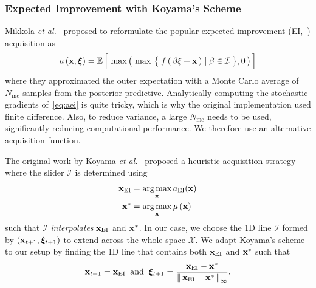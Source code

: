 \subsubsection{Expected Improvement with Koyama's Scheme}
Mikkola \textit{et al.}~\cite{10.1145/3072959.3073598} proposed to reformulate the popular expected improvement (EI,~\cite{jones_efficient_1998}) acquisition as
\begin{align}
  a\,(\mathbf{x}, \bm{\xi})
  = \mathbb{E}\,\Big[\, \max\big(\, \max\,\big\{\; f\,(\,\beta \xi + \mathbf{x}\,) \mid \beta \in \mathcal{I} \;\big\}, 0 \,\big)\,\Big]\label{eq:aei}
\end{align}
where they approximated the outer expectation with a Monte Carlo average of \(N_{\text{mc}}\) samples from the posterior predictive.
Analytically computing the stochastic gradients of~\cref{eq:aei} is quite tricky, which is why the original implementation used finite difference.
Also, to reduce variance, a large \(N_{\text{mc}}\) needs to be used, significantly reducing computational performance.
We therefore use an alternative acquisition function.

The original work by Koyama \textit{et al.}~\cite{koyama_sequential_2020} proposed a heuristic acquisition strategy where the slider \(\mathcal{I}\) is determined using
\begin{align}
  \mathbf{x}_{\mathrm{EI}}   &= \operatorname*{arg\,max}_{\mathbf{x}} a_{\mathrm{EI}}(\mathbf{x}) \label{eq:koyama_ei} \\
  \mathbf{x}^*   &= \operatorname*{arg\,max}_{\mathbf{x}} \mu\,(\mathbf{x}) \label{eq:koyama_opt}
\end{align}
such that \(\mathcal{I}\) \textit{interpolates} \(\mathbf{x}_{\mathrm{EI}}\) and \(\mathbf{x}^*\).
In our case, we choose the 1D line \(\mathcal{I}\) formed by \((\mathbf{x}_{t+1}, \bm{\xi}_{t+1})\) to extend across the whole space \(\mathcal{X}\).
We adapt Koyama's scheme to our setup by finding the 1D line that contains both \(\mathbf{x}_{\mathrm{EI}}\) and \(\mathbf{x}^*\) such that
\begin{align}
  \mathbf{x}_{t+1}   = \mathbf{x}_{\mathrm{EI}}\;\; \text{and} \;\;
  \bm{\xi}_{t+1} = \frac{\mathbf{x}_{\mathrm{EI}} - \mathbf{x}^*}{\left\lVert\,  \mathbf{x}_{\mathrm{EI}} - \mathbf{x}^*  \,\right\rVert_{\infty}}.
\end{align}

